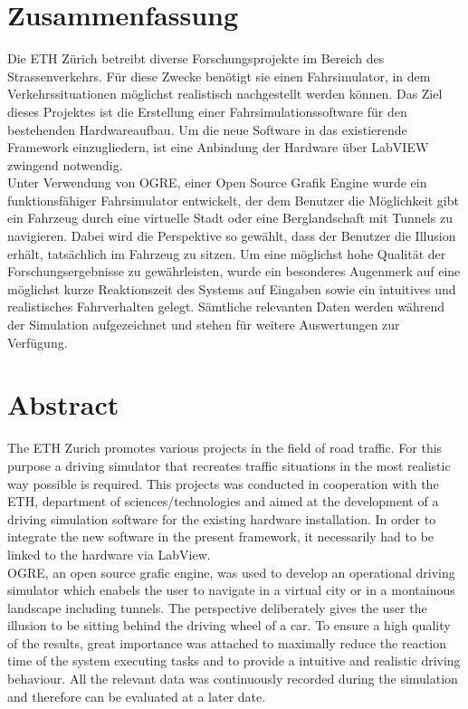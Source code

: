 \section*{Zusammenfassung}
Die ETH Zürich betreibt diverse Forschungsprojekte im Bereich des Strassenverkehrs. Für diese Zwecke benötigt sie einen Fahrsimulator, in dem Verkehrssituationen möglichst realistisch nachgestellt werden können. Das Ziel dieses Projektes ist die Erstellung einer Fahrsimulationssoftware für den bestehenden Hardwareaufbau. Um die neue Software in das existierende Framework einzugliedern, ist eine Anbindung der Hardware über LabVIEW zwingend notwendig.\\
Unter Verwendung von OGRE, einer Open Source Grafik Engine wurde ein funktionsfähiger Fahrsimulator entwickelt, der dem Benutzer die Möglichkeit gibt ein Fahrzeug durch eine virtuelle Stadt oder eine Berglandschaft mit Tunnels zu navigieren. Dabei wird die Perspektive so gewählt, dass der Benutzer die Illusion erhält, tatsächlich im Fahrzeug zu sitzen.
Um eine möglichst hohe Qualität der Forschungsergebnisse zu gewährleisten, wurde ein besonderes Augenmerk auf eine möglichst kurze Reaktionszeit des Systems auf Eingaben sowie ein intuitives und realistisches Fahrverhalten gelegt.
Sämtliche relevanten Daten werden während der Simulation aufgezeichnet und stehen für weitere Auswertungen zur Verfügung.
\newpage
\thispagestyle{empty}
\hspace{1cm}
\newpage
\section*{Abstract}
The ETH Zurich promotes various projects in the field of road traffic. For this purpose a driving simulator that recreates traffic situations in the most realistic way possible is required. This projects was conducted in cooperation with the ETH, department of sciences/technologies and aimed at the development of a driving simulation software for the existing hardware installation. In order to integrate the new software in the present framework, it necessarily had to be linked to the hardware via LabView. \\
OGRE, an open source grafic engine, was used to develop an operational driving simulator which enabels the user to navigate in a virtual city or in a montainous landscape including tunnels. The perspective deliberately gives the user the illusion to be sitting behind the driving wheel of a car. To ensure a high quality of the results, great importance was attached to maximally reduce the reaction time of the system executing tasks and to provide a intuitive and realistic driving behaviour. All the relevant data was continuously recorded during the simulation and therefore can be evaluated at a later date.
\newpage
\thispagestyle{empty}
\hspace{1cm}
\newpage
